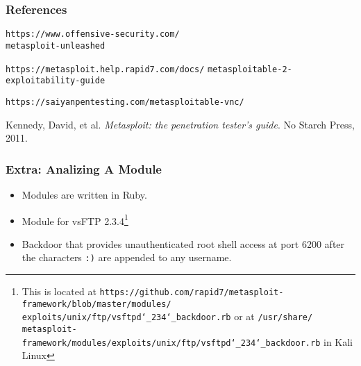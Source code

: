 \documentclass[aspectratio=169]{beamer}
\begin{document}
\begin{frame}
\frametitle{References}
\begin{thebibliography}{9}

        \texttt{https://www.offensive-security.com/}\\
        \texttt{metasploit-unleashed}

        \texttt{https://metasploit.help.rapid7.com/docs/}
        \texttt{metasploitable-2-exploitability-guide}

        \texttt{https://saiyanpentesting.com/metasploitable-vnc/}
    
        Kennedy, David, et al. \textit{Metasploit: the penetration tester's guide}. No Starch Press, 2011.
    
    \end{thebibliography}

\end{frame}

\begin{frame}
\frametitle{Extra: Analizing A Module}

\begin{itemize}
    \item Modules are written in Ruby. \\
    \item Module for vsFTP 2.3.4\footnote{This is located at \texttt{https://github.com/rapid7/metasploit-framework/blob/master/modules/ \\exploits/unix/ftp/vsftpd\char`\_234\char`\_backdoor.rb} or at \texttt{/usr/share/ \\metasploit-framework/modules/exploits/unix/ftp/vsftpd\char`\_234\char`\_backdoor.rb} in Kali Linux} \\
    \item Backdoor that provides unauthenticated root shell access at port 6200 after the characters \texttt{:)} are appended to any username.
\end{itemize}

\end{frame}
\end{document}
